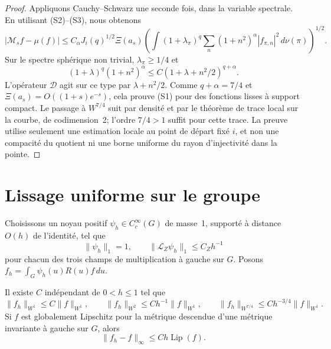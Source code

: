 \begin{proof}
Appliquons Cauchy--Schwarz une seconde fois, dans la variable spectrale.
En utilisant (S2)--(S3), nous obtenons
\[
 |\mathcal M_s f-\mu(f)|
 \le C_\alpha J_i(q)^{1/2}\Xi(a_s)
 \left(\int(1+\lambda_\pi)^q
                  \sum_n(1+n^2)^\alpha|f_{\pi,n}|^2\,d\nu(\pi)
 \right)^{1/2}.
\]
Sur le spectre sphérique non trivial, $\lambda_\pi\ge1/4$ et
\[
 (1+\lambda)^q(1+n^2)^\alpha
 \le C(1+\lambda+n^2/2)^{q+\alpha}.
\]
L'opérateur $\mathcal D$ agit sur ce type par $\lambda+n^2/2$.
Comme $q+\alpha=7/4$ et
$\Xi(a_s)=O((1+s)e^{-s})$, cela prouve (S1) pour des fonctions lisses
à support compact. Le passage à $W^{7/4}$ suit par densité et par le
théorème de trace local sur la courbe, de codimension~2; l'ordre
$7/4>1$ suffit pour cette trace. La preuve utilise seulement une
estimation locale au point de départ fixé $i$, et non une compacité
du quotient ni une borne uniforme du rayon d'injectivité dans la pointe.
\end{proof}

\section{Lissage uniforme sur le groupe}

Choisissons un noyau positif $\psi_h\in C_c^\infty(G)$ de masse~1,
supporté à distance $O(h)$ de l'identité, tel que
\[
 \|\psi_h\|_1=1,\qquad
 \|\mathcal L_Z\psi_h\|_1\le C_Zh^{-1}
\]
pour chacun des trois champs de multiplication à gauche sur $G$.
Posons $f_h=\int_G\psi_h(u)R(u)f\,du$.

\begin{lemma}
Il existe $C$ indépendant de $0<h\le1$ tel que
\[
 \|f_h\|_{W^1}\le C\|f\|_{W^1},\qquad
 \|f_h\|_{W^2}\le Ch^{-1}\|f\|_{W^1},\qquad
 \|f_h\|_{W^{7/4}}\le Ch^{-3/4}\|f\|_{W^1}.
 \tag{S4}
\]
Si $f$ est globalement Lipschitz pour la métrique descendue d'une
métrique invariante à gauche sur $G$, alors
\[
 \|f_h-f\|_\infty\le Ch\operatorname{Lip}(f).
 \tag{S5}
\]
\end{lemma}

